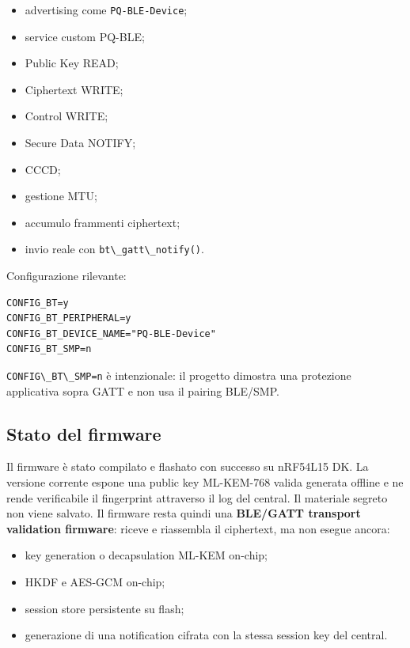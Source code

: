 \documentclass[11pt,a4paper]{article}
\providecommand{\tightlist}{\setlength{\itemsep}{0pt}\setlength{\parskip}{0pt}}
\newcommand{\passthrough}[1]{#1}
\begin{document}
\begin{itemize}
\tightlist
\item
  advertising come \passthrough{\lstinline!PQ-BLE-Device!};
\item
  service custom PQ-BLE;
\item
  Public Key READ;
\item
  Ciphertext WRITE;
\item
  Control WRITE;
\item
  Secure Data NOTIFY;
\item
  CCCD;
\item
  gestione MTU;
\item
  accumulo frammenti ciphertext;
\item
  invio reale con \passthrough{\lstinline!bt\_gatt\_notify()!}.
\end{itemize}

Configurazione rilevante:

\begin{lstlisting}
CONFIG_BT=y
CONFIG_BT_PERIPHERAL=y
CONFIG_BT_DEVICE_NAME="PQ-BLE-Device"
CONFIG_BT_SMP=n
\end{lstlisting}

\passthrough{\lstinline!CONFIG\_BT\_SMP=n!} è intenzionale: il progetto
dimostra una protezione applicativa sopra GATT e non usa il pairing
BLE/SMP.

\subsection{Stato del firmware}\label{stato-del-firmware}

Il firmware è stato compilato e flashato con successo su nRF54L15 DK.
La versione corrente espone una public key ML-KEM-768 valida generata
offline e ne rende verificabile il fingerprint attraverso il log del
central. Il materiale segreto non viene salvato. Il firmware resta quindi
una \textbf{BLE/GATT transport validation firmware}: riceve e riassembla
il ciphertext, ma non esegue ancora:

\begin{itemize}
\tightlist
\item
  key generation o decapsulation ML-KEM on-chip;
\item
  HKDF e AES-GCM on-chip;
\item
  session store persistente su flash;
\item
  generazione di una notification cifrata con la stessa session key del
  central.
\end{itemize}
\end{document}
